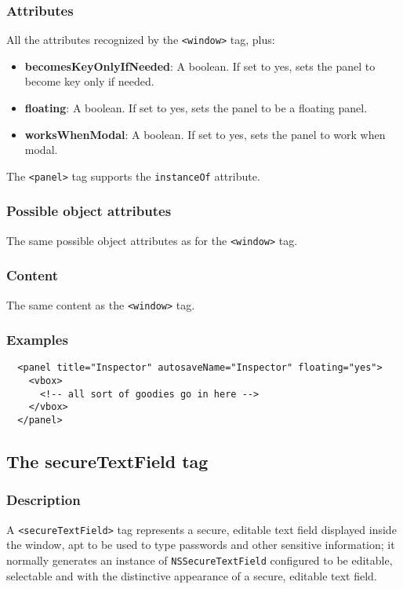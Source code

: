 \subsubsection{Attributes}
All the attributes recognized by the \texttt{<window>} tag, plus:
\begin{itemize}
\item {\bf becomesKeyOnlyIfNeeded}: A boolean.  If set to yes, sets
  the panel to become key only if needed.
\item {\bf floating}: A boolean.  If set to yes, sets the panel to be
  a floating panel.
\item {\bf worksWhenModal}: A boolean.  If set to yes, sets the panel
  to work when modal.
\end{itemize}

The \texttt{<panel>} tag supports the \texttt{instanceOf} attribute.

\subsubsection{Possible object attributes}
The same possible object attributes as for the \texttt{<window>} tag.

\subsubsection{Content}
The same content as the \texttt{<window>} tag.

\subsubsection{Examples}
\begin{verbatim}
  <panel title="Inspector" autosaveName="Inspector" floating="yes">
    <vbox>
      <!-- all sort of goodies go in here -->
    </vbox>
  </panel>
\end{verbatim}

\subsection{The secureTextField tag}

\subsubsection{Description}
A \texttt{<secureTextField>} tag represents a secure, editable text
field displayed inside the window, apt to be used to type passwords
and other sensitive information; it normally generates an instance of
\texttt{NSSecureTextField} configured to be editable, selectable and
with the distinctive appearance of a secure, editable text field.

